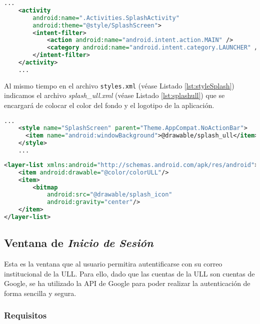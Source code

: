 \begin{lstlisting}[language=XML,caption={Fichero \texttt{AndroidManifest.xml}, activity que inicia la aplicación.}, label={lst:manifestInicio}]
    ...
    <activity
        android:name=".Activities.SplashActivity"
        android:theme="@style/SplashScreen">
        <intent-filter> 
            <action android:name="android.intent.action.MAIN" />
            <category android:name="android.intent.category.LAUNCHER" />
        </intent-filter>
    </activity>
    ...
\end{lstlisting}

Al mismo tiempo en el archivo \texttt{styles.xml} (véase Listado \ref{lst:styleSplash}) indicamos el archivo \textit{splash\_ull.xml} (véase Listado \ref{lst:splashull}) que se encargará de colocar el color del fondo y el logotipo de la aplicación. 

\begin{lstlisting}[language=XML,caption={Fichero \textit{styles.xml}, estilo de la \textit{Splash Screen}.}, label={lst:styleSplash}]
    ...
    <style name="SplashScreen" parent="Theme.AppCompat.NoActionBar">
      <item name="android:windowBackground">@drawable/splash_ull</item>
    </style>
    ...
\end{lstlisting}

\begin{lstlisting}[language=XML,caption={Fichero  \textit{splash\_ull.xml}, configuración del color de fondo y el logotipo de la aplicación. }, label={lst:splashull}]
<layer-list xmlns:android="http://schemas.android.com/apk/res/android">
    <item android:drawable="@color/colorULL"/>
    <item>
        <bitmap
            android:src="@drawable/splash_icon"
            android:gravity="center"/>
    </item>
</layer-list>
\end{lstlisting}

\subsection{Ventana de \textit{Inicio de Sesión} }

Esta es la ventana que al usuario permitira autentificarse con su correo institucional de la ULL. Para ello, dado que las cuentas de la ULL son cuentas de Google, se ha utilizado la API de Google para poder realizar la autenticación de forma sencilla y segura.

\subsubsection{ Requisitos }  

